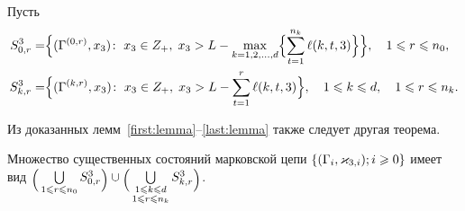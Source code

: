 Пусть
\begin{align*}
  S^3_{0, r} = & 
  \Bigl\{
  (\Gamma^{(0,  r)},  x_3) \colon \; x_3\in Z_+, \; x_3 > L - \max\limits_{k=1,  2, 
    \ldots,  d}
  \Bigl\{ \sum_{t=1}^{n_k} \ell({k,  t,  3}) \Bigl\}\Bigl\},  
  \quad 1 \leqslant r \leqslant n_0,  \\
  S^3_{k,  r} = & 
  \Bigl\{
  (\Gamma^{(k,  r)},  x_3) \colon \; x_3\in Z_+, \; x_3 > L - \sum_{t=1}^{r} \ell({k,  t,  3})
  \Bigr\},  
  \quad 1 \leqslant k \leqslant d,  \quad 1 \leqslant r \leqslant n_k.
\end{align*}

Из доказанных лемм~\ref{first:lemma}--\ref{last:lemma} также следует другая теорема.
\begin{theorem}
Множество существенных состояний марковской цепи $\MarkThree$ имеет вид $\raisebox{-.5ex}{$\Bigl($}\bigcup\limits_{1 \leqslant r \leqslant n_0}S^3_{0, r}\raisebox{-.5ex}{$\Bigr)$}\cup \raisebox{-.5ex}{$\Bigl($}\bigcup\limits_{\substack{1 \leqslant k \leqslant d\\ 1 \leqslant r \leqslant n_k}} S^3_{k, r}\raisebox{-.5ex}{$\Bigr)$}$.
\end{theorem}




